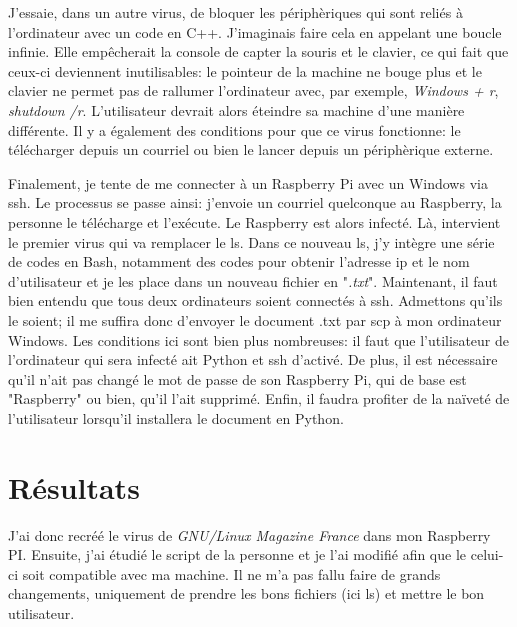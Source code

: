J'essaie, dans un autre virus, de bloquer les périphèriques qui sont reliés à l'ordinateur avec un code en C++. J'imaginais faire cela en appelant une boucle infinie. Elle empêcherait la console de capter la souris et le clavier, ce qui fait que ceux-ci deviennent inutilisables: le pointeur de la machine ne bouge plus et le clavier ne permet pas de rallumer l'ordinateur avec, par exemple, \textit{Windows + r}, \textit{shutdown /r}. L'utilisateur devrait alors éteindre sa machine d'une manière différente.
Il y a également des conditions pour que ce virus fonctionne: le télécharger depuis un courriel ou bien le lancer depuis un périphèrique externe. 


Finalement, je tente de me connecter à un Raspberry Pi avec un Windows via ssh. Le processus se passe ainsi: j'envoie un courriel quelconque au Raspberry, la personne le télécharge et l'exécute. Le Raspberry est alors infecté. Là, intervient le premier virus qui va remplacer le ls. Dans ce nouveau ls, j'y intègre une série de codes en Bash, notamment des codes pour obtenir l'adresse ip et le nom d'utilisateur et je les place dans un nouveau fichier en "\textit{.txt}".
Maintenant, il faut bien entendu que tous deux ordinateurs soient connectés à ssh. Admettons qu'ils le soient; il me suffira donc d'envoyer le document .txt par scp à mon ordinateur Windows. 
Les conditions ici sont bien plus nombreuses: il faut que l'utilisateur de l'ordinateur qui sera infecté ait Python et ssh d'activé. De plus, il est nécessaire qu'il n'ait pas changé le mot de passe de son Raspberry Pi, qui de base est "Raspberry" ou bien, qu'il l'ait supprimé. Enfin, il faudra profiter de la naïveté de l'utilisateur lorsqu'il installera le document en Python.   
\section{Résultats}

J'ai donc recréé le virus de \textit{GNU/Linux Magazine France}  \cite{LinuxMag} dans mon Raspberry PI. Ensuite, j'ai étudié le script de la personne et je l'ai modifié afin que le celui-ci soit compatible avec ma machine. Il ne m'a pas fallu faire de grands changements, uniquement de prendre les bons fichiers (ici ls) et mettre le bon utilisateur. 
 

